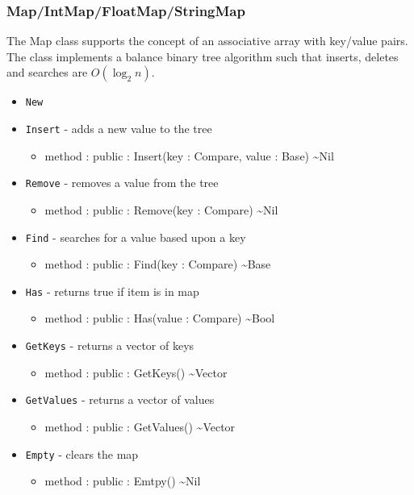 \documentclass[11pt]{article}
\begin{document}
\subsubsection{Map/IntMap/FloatMap/StringMap}
The Map class supports the concept of an associative array with
key/value pairs.  The class implements a balance binary tree algorithm
such that inserts, deletes and searches are $O(\log_2 n)$.
\begin{itemize}
\item \texttt{New}
\item \texttt{Insert} - adds a new value to the tree
  \begin{itemize}
  \item method : public : Insert(key : Compare, value : Base)
    \textasciitilde Nil
  \end{itemize}
\item \texttt{Remove} - removes a value from the tree
  \begin{itemize}
  \item method : public : Remove(key : Compare) \textasciitilde Nil
  \end{itemize}
\item \texttt{Find} - searches for a value based upon a key
  \begin{itemize}
  \item method : public : Find(key : Compare) \textasciitilde Base
  \end{itemize}
\item \texttt{Has} - returns true if item is in map
  \begin{itemize}
  \item method : public : Has(value : Compare) \textasciitilde Bool
  \end{itemize}
\item \texttt{GetKeys} - returns a vector of keys
  \begin{itemize}
  \item method : public : GetKeys() \textasciitilde Vector
  \end{itemize}
\item \texttt{GetValues} - returns a vector of values
  \begin{itemize}
  \item method : public : GetValues() \textasciitilde Vector
  \end{itemize}
\item \texttt{Empty} - clears the map
  \begin{itemize}
  \item method : public : Emtpy() \textasciitilde Nil

\end{itemize}
\end{itemize}
\end{document}
